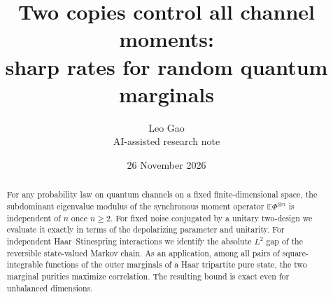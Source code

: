 \documentclass[11pt]{article}
\title{Two copies control all channel moments:\\sharp rates for random quantum marginals}
\author{Leo Gao\\\small AI-assisted research note}
\date{26 November 2026}
\newcommand{\E}{\mathbb E}
\begin{document}
\maketitle
\begin{abstract}
For any probability law on quantum channels on a fixed finite-dimensional space, the subdominant eigenvalue modulus of the synchronous moment operator $\E\Phi^{\otimes n}$ is independent of $n$ once $n\ge2$. For fixed noise conjugated by a unitary two-design we evaluate it exactly in terms of the depolarizing parameter and unitarity. For independent Haar--Stinespring interactions we identify the absolute $L^2$ gap of the reversible state-valued Markov chain. As an application, among all pairs of square-integrable functions of the outer marginals of a Haar tripartite pure state, the two marginal purities maximize correlation. The resulting bound is exact even for unbalanced dimensions.
\end{abstract}
\end{document}
